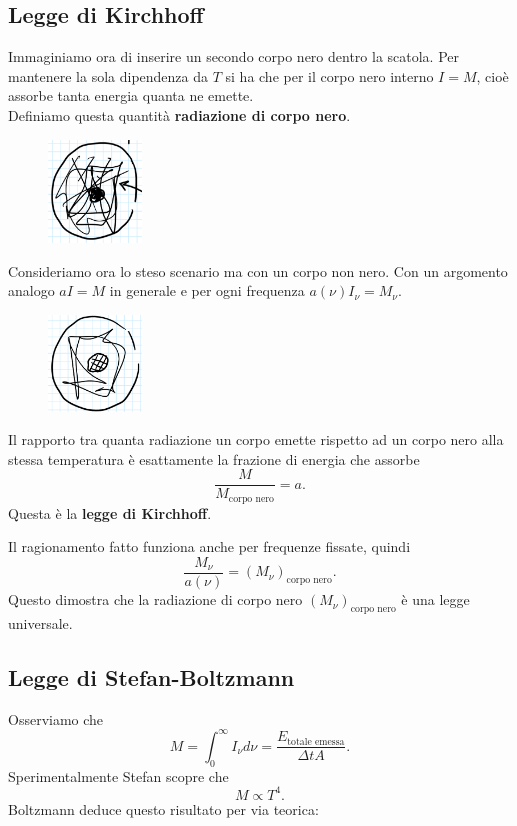 \subsection{Legge di Kirchhoff}
Immaginiamo ora di inserire un secondo corpo nero dentro la scatola. 
Per mantenere la sola dipendenza da $T$ si ha che per il corpo nero interno $I=M$, cio\`e assorbe tanta energia quanta ne emette.\\
Definiamo questa quantit\`a \textbf{radiazione di corpo nero}.

\begin{figure}[!htb]
    \centering
    \includegraphics[width=2.5cm]{images/corpo_nero_con_dentro_corpo_nero.png}
\end{figure}

\noindent
Consideriamo ora lo steso scenario ma con un corpo non nero. Con un argomento analogo $aI=M$ in generale e per ogni frequenza $a(\nu)I_\nu=M_\nu$.

\begin{figure}[!htb]
    \centering
    \includegraphics[width=2.5cm]{images/corpo_nero_con_dentro_corpo_grigio.png}
\end{figure}

\begin{remark}
Il rapporto tra quanta radiazione un corpo emette rispetto ad un corpo nero alla stessa temperatura \`e esattamente la frazione di energia che assorbe
\[\frac{M}{M_{\text{corpo nero}}}=a.\]
Questa \`e la \textbf{legge di Kirchhoff}.
\end{remark}

\noindent Il ragionamento fatto funziona anche per frequenze fissate, quindi
\[\frac{M_\nu}{a(\nu)}=(M_\nu)_{\text{corpo nero}}.\]
Questo dimostra che la radiazione di corpo nero $(M_\nu)_{\text{corpo nero}}$ \`e una legge universale.

\subsection{Legge di Stefan-Boltzmann}
Osserviamo che
\[M=\int_0^\infty I_\nu d\nu=\frac{E_{\text{totale emessa}}}{\Delta t A}.\]
Sperimentalmente Stefan scopre che
\[M\propto T^4.\]
Boltzmann deduce questo risultato per via teorica:

